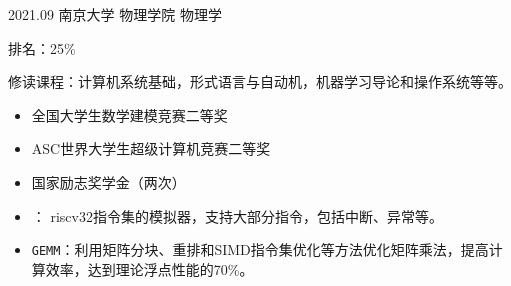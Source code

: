 \documentclass[zh]{resume}
\begin{document}
\makeheader


\begin{competences}
\end{competences}

\begin{educations}
  \education%
  {2021.09}%
  {南京大学}%
  {物理学院}%
  {物理学}%
  \item 排名：25\%
  \item 修读课程：计算机系统基础，形式语言与自动机，机器学习导论和操作系统等等。
\end{educations}

\begin{itemize}
  \item 全国大学生数学建模竞赛二等奖
  \item ASC世界大学生超级计算机竞赛二等奖
  \item 国家励志奖学金（两次）
\end{itemize}

\begin{itemize}
  \item {}：
        riscv32指令集的模拟器，支持大部分指令，包括中断、异常等。
  \item \texttt{GEMM}：利用矩阵分块、重排和SIMD指令集优化等方法优化矩阵乘法，提高计算效率，达到理论浮点性能的70\%。
\end{itemize}
\end{document}
